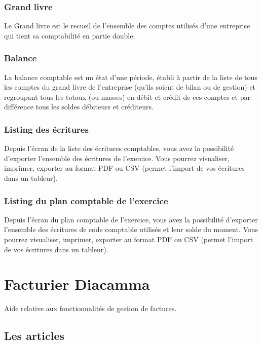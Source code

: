 \documentclass[a4paper,10pt,oneside,french]{sphinxmanual}
\begin{document}
\subsection{Grand livre}
\label{\detokenize{accounting/reporting:grand-livre}}
Le Grand livre est le recueil de l’ensemble des comptes utilisés d’une entreprise qui tient sa comptabilité en partie double.


\subsection{Balance}
\label{\detokenize{accounting/reporting:balance}}
La balance comptable est un état d’une période, établi à partir de la liste de tous les comptes du grand livre de l’entreprise (qu’ils soient de bilan ou de gestion) et regroupant tous les totaux (ou masses) en débit et crédit de ces comptes et par différence tous les soldes débiteurs et créditeurs.


\subsection{Listing des écritures}
\label{\detokenize{accounting/reporting:listing-des-ecritures}}
Depuis l’écran de la liste des écritures comptables, vous avez la possibilité d’exporter l’ensemble des écritures de l’exercice.
Vous pourrez visualiser, imprimer, exporter au format PDF ou CSV (permet l’import de vos écritures dans un tableur).


\subsection{Listing du plan comptable de l’exercice}
\label{\detokenize{accounting/reporting:listing-du-plan-comptable-de-l-exercice}}
Depuis l’écran du plan comptable de l’exercice, vous avez la possibilité d’exporter l’ensemble des écritures de code comptable utilisés et leur solde du moment.
Vous pourrez visualiser, imprimer, exporter au format PDF ou CSV (permet l’import de vos écritures dans un tableur).


\chapter{Facturier Diacamma}
\label{\detokenize{invoice/index::doc}}\label{\detokenize{invoice/index:facturier-diacamma}}
Aide relative aux fonctionnalités de gestion de factures.


\section{Les articles}
\label{\detokenize{invoice/articles::doc}}\label{\detokenize{invoice/articles:les-articles}}
\end{document}

